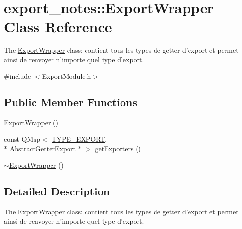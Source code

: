 \hypertarget{classexport__notes_1_1_export_wrapper}{\section{export\-\_\-notes\-:\-:Export\-Wrapper Class Reference}
\label{classexport__notes_1_1_export_wrapper}
}


The \hyperlink{classexport__notes_1_1_export_wrapper}{Export\-Wrapper} class\-: contient tous les types de getter d'export et permet ainsi de renvoyer n'importe quel type d'export.  




{\ttfamily \#include $<$Export\-Module.\-h$>$}

\subsection*{Public Member Functions}
\begin{DoxyCompactItemize}
\item 
\hyperlink{classexport__notes_1_1_export_wrapper_ac2c597af4c85057ae4d85b5d55c906b6}{Export\-Wrapper} ()
\item 
const Q\-Map$<$ \hyperlink{_t_y_p_e_s___e_x_p_o_r_t_8h_a25a17d8584d83ab977791df2476e006c}{T\-Y\-P\-E\-\_\-\-E\-X\-P\-O\-R\-T}, \\*
\hyperlink{classexport__notes_1_1_abstract_getter_export}{Abstract\-Getter\-Export} $\ast$ $>$ \hyperlink{classexport__notes_1_1_export_wrapper_ac90b81866bbcddfa979720fa5f4b7fac}{get\-Exporters} ()
\item 
\hyperlink{classexport__notes_1_1_export_wrapper_ab63a828aa08ad2185354142aa4c8e3cf}{$\sim$\-Export\-Wrapper} ()
\end{DoxyCompactItemize}


\subsection{Detailed Description}
The \hyperlink{classexport__notes_1_1_export_wrapper}{Export\-Wrapper} class\-: contient tous les types de getter d'export et permet ainsi de renvoyer n'importe quel type d'export. 

